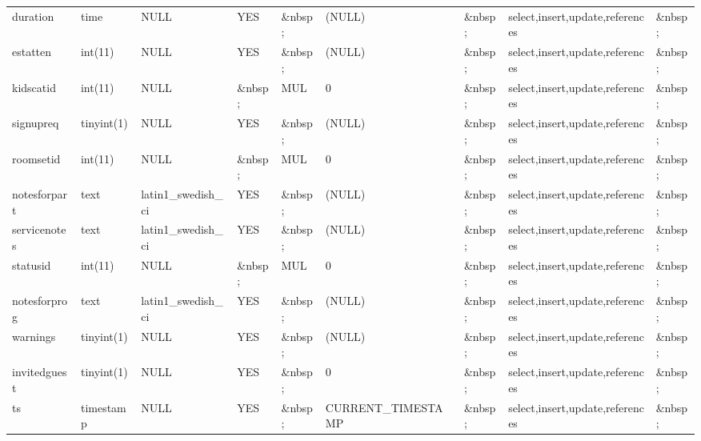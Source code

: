 \documentclass[tablesignature]{scrartcl}
\begin{document}
\begin{longtable}{|l|l|l|l|l|l|l|l|l|}
 duration        &  time          &  NULL                     &  YES      &  \&nbsp;  &  (NULL)                &  \&nbsp;            &  select,insert,update,references  &  \&nbsp;  \\
 estatten        &  int(11)       &  NULL                     &  YES      &  \&nbsp;  &  (NULL)                &  \&nbsp;            &  select,insert,update,references  &  \&nbsp;  \\
 kidscatid       &  int(11)       &  NULL                     &  \&nbsp;  &  MUL      &  0                     &  \&nbsp;            &  select,insert,update,references  &  \&nbsp;  \\
 signupreq       &  tinyint(1)    &  NULL                     &  YES      &  \&nbsp;  &  (NULL)                &  \&nbsp;            &  select,insert,update,references  &  \&nbsp;  \\
 roomsetid       &  int(11)       &  NULL                     &  \&nbsp;  &  MUL      &  0                     &  \&nbsp;            &  select,insert,update,references  &  \&nbsp;  \\
 notesforpart    &  text          &  latin1\_{}swedish\_{}ci  &  YES      &  \&nbsp;  &  (NULL)                &  \&nbsp;            &  select,insert,update,references  &  \&nbsp;  \\
 servicenotes    &  text          &  latin1\_{}swedish\_{}ci  &  YES      &  \&nbsp;  &  (NULL)                &  \&nbsp;            &  select,insert,update,references  &  \&nbsp;  \\
 statusid        &  int(11)       &  NULL                     &  \&nbsp;  &  MUL      &  0                     &  \&nbsp;            &  select,insert,update,references  &  \&nbsp;  \\
 notesforprog    &  text          &  latin1\_{}swedish\_{}ci  &  YES      &  \&nbsp;  &  (NULL)                &  \&nbsp;            &  select,insert,update,references  &  \&nbsp;  \\
 warnings        &  tinyint(1)    &  NULL                     &  YES      &  \&nbsp;  &  (NULL)                &  \&nbsp;            &  select,insert,update,references  &  \&nbsp;  \\
 invitedguest    &  tinyint(1)    &  NULL                     &  YES      &  \&nbsp;  &  0                     &  \&nbsp;            &  select,insert,update,references  &  \&nbsp;  \\
 ts              &  timestamp     &  NULL                     &  YES      &  \&nbsp;  &  CURRENT\_{}TIMESTAMP  &  \&nbsp;            &  select,insert,update,references  &  \&nbsp;  \\
\hline
\end{longtable}
\end{document}

